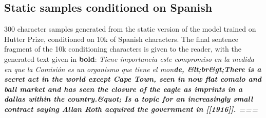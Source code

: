 \documentclass{article} %
\begin{document}
\subsection{Static samples conditioned on Spanish}
300 character samples generated from the static version of the model trained on Hutter Prize, conditioned on 10k of Spanish characters. The final sentence fragment of the 10k conditioning characters is given to the reader, with the generated text given in \textbf{bold}:
\newline
\newline
\newline
\textsl{
Tiene importancia este compromiso en la medida en que la Comisión es un organismo que tiene el mon\textbf{de,
\newline
\&lt;br\&gt;There is a secret act in the world except Cape Town, seen in now flat comalo and ball market and has seen the closure of the eagle as imprints in a dallas within the country.\&quot; Is a topic for an increasingly small contract saying Allan Roth acquired the government in {[}{[}1916{]}{]}.
\newline
\newline
===
}
}
\end{document}
